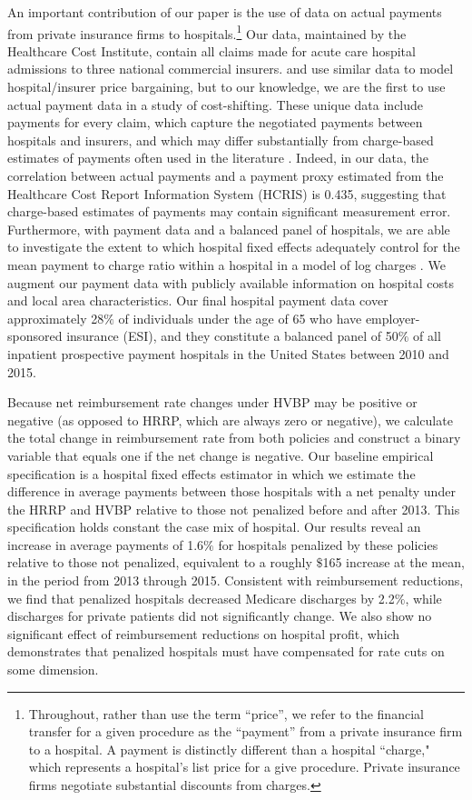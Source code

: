 \documentclass[12pt]{article}
\begin{document}
An important contribution of our paper is the use of data on actual payments from private insurance firms to hospitals.\footnote{Throughout, rather than use the term ``price'', we refer to the financial transfer for a given procedure as the ``payment'' from a private insurance firm to a hospital.  A payment is distinctly different than a hospital ``charge," which represents a hospital's list price for a give procedure.  Private insurance firms negotiate substantial discounts from charges.}  Our data, maintained by the Healthcare Cost Institute, contain all claims made for acute care hospital admissions to three national commercial insurers.  \cite{gowrisankaran2015} and \cite{cooper2015} use similar data to model hospital/insurer price bargaining, but to our knowledge, we are the first to use actual payment data in a study of cost-shifting.   These unique data include payments for every claim, which capture the negotiated payments between hospitals and insurers, and which may differ substantially from charge-based estimates of payments often used in the literature \citep{dafny2009,dranove2017}. Indeed, in our data, the correlation between actual payments and a payment proxy estimated from the Healthcare Cost Report Information System (HCRIS) is 0.435, suggesting that charge-based estimates of payments may contain significant measurement error.  Furthermore, with payment data and a balanced panel of hospitals, we are able to investigate the extent to which hospital fixed effects adequately control for the mean payment to charge ratio within a hospital in a model of log charges \citep{cutler2000}.  We augment our payment data with publicly available information on hospital costs and local area characteristics.  Our final hospital payment data cover approximately 28$\%$ of individuals under the age of 65 who have employer-sponsored insurance (ESI), and they constitute a balanced panel of  50$\%$ of all inpatient prospective payment hospitals in the United States between 2010 and 2015.       


Because net reimbursement rate changes under HVBP may be positive or negative (as opposed to HRRP, which are always zero or negative), we calculate the total change in reimbursement rate from both policies and construct a binary variable that equals one if the net change is negative.   Our baseline empirical specification is a hospital fixed effects estimator in which we estimate the difference in average payments between those hospitals with a net penalty under the HRRP and HVBP relative to those not penalized before and after 2013.  This specification holds constant the case mix of hospital.  Our results reveal an increase in average payments of 1.6$\%$ for hospitals penalized by these policies relative to those not penalized, equivalent to a roughly $\$$165 increase at the mean, in the period from 2013 through 2015. Consistent with reimbursement reductions, we find that penalized hospitals decreased Medicare discharges by 2.2$\%$, while discharges for private patients did not significantly change.  We also show no significant effect of reimbursement reductions on hospital profit, which demonstrates that penalized hospitals must have compensated for rate cuts on some dimension.   
\end{document}
